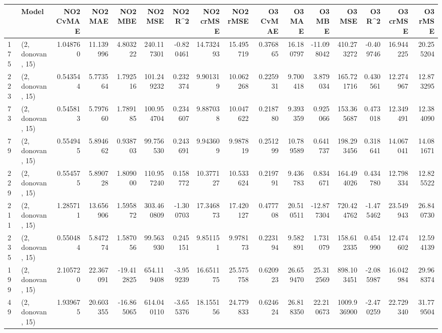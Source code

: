 \begin{tabular}{llrrrrrrrrrrrrrr}
\toprule
{} &             Model &  NO2 CvMAE &    NO2 MAE &    NO2 MBE &      NO2 MSE &    NO2 R\textasciicircum2 &  NO2 crMSE &   NO2 rMSE &  O3 CvMAE &     O3 MAE &     O3 MBE &       O3 MSE &    O3 R\textasciicircum2 &   O3 crMSE &    O3 rMSE \\
\midrule
175 &  (2, donovan, 15) &   1.048760 &  11.139996 &   4.803222 &   240.117301 &  -0.820461 &  14.732493 &  15.495719 &  0.376865 &  16.180797 & -11.098042 &   410.273272 & -0.409746 &  16.944225 &  20.255204 \\
223 &  (2, donovan, 15) &   0.543544 &   5.773564 &   1.792516 &   101.249232 &   0.232374 &   9.901319 &  10.062268 &  0.225931 &   9.700418 &   3.879034 &   165.721716 &  0.430561 &  12.274967 &  12.873295 \\
73  &  (2, donovan, 15) &   0.545813 &   5.797660 &   1.789185 &   100.954704 &   0.234607 &   9.887038 &  10.047622 &  0.218780 &   9.393359 &   0.925066 &   153.365687 &  0.473018 &  12.349491 &  12.384090 \\
79  &  (2, donovan, 15) &   0.554945 &   5.894662 &   0.938703 &    99.756530 &   0.243691 &   9.943609 &   9.987819 &  0.251299 &  10.789589 &   0.641737 &   198.293456 &  0.318641 &  14.067041 &  14.081671 \\
229 &  (2, donovan, 15) &   0.554575 &   5.890728 &   1.809000 &   110.957240 &   0.158772 &  10.377127 &  10.533624 &  0.219791 &   9.436783 &   0.834671 &   164.494026 &  0.434780 &  12.798334 &  12.825522 \\
211 &  (2, donovan, 15) &   1.285711 &  13.656906 &   1.595872 &   303.460809 &  -1.300703 &  17.346873 &  17.420127 &  0.477708 &  20.510511 & -12.877304 &   720.424762 & -1.475462 &  23.549943 &  26.840730 \\
235 &  (2, donovan, 15) &   0.550484 &   5.847274 &   1.587056 &    99.563930 &   0.245151 &   9.851151 &   9.978173 &  0.223194 &   9.582891 &   1.731079 &   158.612335 &  0.454990 &  12.474602 &  12.594139 \\
199 &  (2, donovan, 15) &   2.105720 &  22.367091 & -19.412825 &   654.119408 &  -3.959239 &  16.651175 &  25.575758 &  0.620923 &  26.659470 &  25.312569 &   898.103451 & -2.085987 &  16.042984 &  29.968374 \\
49  &  (2, donovan, 15) &   1.939675 &  20.603355 & -16.865065 &   614.040110 &  -3.655376 &  18.155156 &  24.779833 &  0.624624 &  26.818350 &  22.210673 &  1009.936900 & -2.470259 &  22.729340 &  31.779504 \\

\end{tabular}
